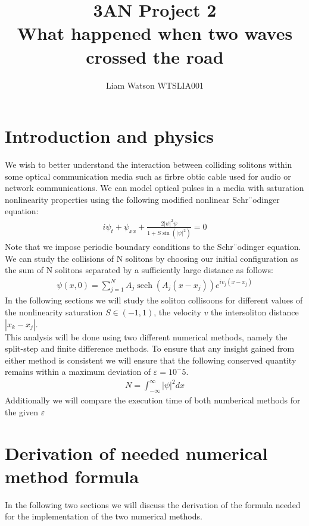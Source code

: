 \documentclass{article}
\title{3AN Project 2\\ What happened when two waves crossed the road}
\author{Liam Watson WTSLIA001}
\DeclareMathOperator{\sech}{sech}
\begin{document}
\maketitle
\section{Introduction and physics}
We wish to better understand the interaction between colliding solitons within some optical communication media such as firbre obtic cable used for audio or network communications. 
We can model optical pulses in a media with saturation nonlinearity properties using the following modified nonlinear  Schr¨odinger equation:
\begin{align}
i\psi_t + \psi_{xx} + \frac{2|\psi|^2\psi}{1+S\sin(|\psi|^2)} = 0
\end{align}
Note that we impose periodic boundary conditions to the Schr¨odinger equation. \\
We can study the collisions of N solitons by choosing our initial configuration as the sum of N solitons separated by a sufficiently large distance as follows:
\begin{align}
\psi (x,0) = \sum_{j=1}^N A_j \sech(A_j (x-x_j))e^{iv_j(x-x_j)}
\end{align}
In the following sections we will study the soliton collisoons for different values of the nonlinearity saturation $S\in(-1,1)$, the velocity $v$ the intersoliton distance $|x_k-x_j|$. \\
This analysis will be done using two different numerical methods, namely the split-step and finite difference methods. To ensure that any insight gained from either method is consistent we will ensure that the following conserved quantity remains within a maximum deviation of $\varepsilon = 10^-5$.
\begin{align}
N = \int_{-\infty}^\infty |\psi|^2 dx
\end{align}
Additionally we will compare the execution time of both numberical methods for the given $\varepsilon$
\section{Derivation of needed numerical method formula}
In the following two sections we will discuss the derivation of the formula needed for the implementation of the two numerical methods. 
\end{document}
